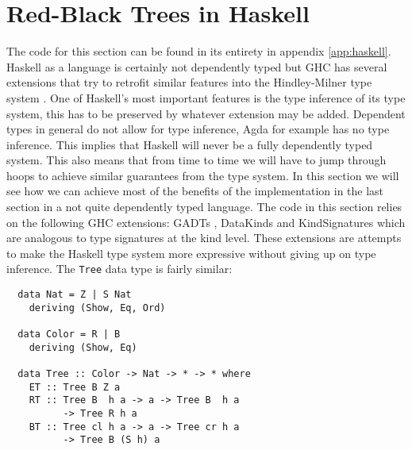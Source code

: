 \documentclass[journal, retainorgcmds]{IEEEtran}
\newcommand{\ihask}[1]{\texttt{#1}}
\begin{document}
\section{Red-Black Trees in Haskell}

The code for this section can be found in its entirety in appendix
\ref{app:haskell}.
Haskell as a language is certainly not dependently typed but GHC \cite{ghc} has
several extensions that try to retrofit similar features into the
Hindley-Milner type system \cite{hindley}.
One of Haskell's most important features is the type inference of its type
system, this has to be preserved by whatever extension may be added.
Dependent types in general do not allow for type inference, Agda for example
has no type inference.
This implies that Haskell will never be a fully dependently typed system.
This also means that from time to time we will have to jump through hoops to
achieve similar guarantees from the type system.
In this section we will see how we can achieve most of the benefits of the
implementation in the last section in a not quite dependently typed language.
The code in this section relies on the following GHC extensions: GADTs
\cite{gadts}, DataKinds \cite{datakinds} and KindSignatures which are analogous
to type signatures at the kind level.
These extensions are attempts to make the Haskell type system more expressive
without giving up on type inference.
The \ihask{Tree} data type is fairly similar:

\begin{verbatim}
  data Nat = Z | S Nat
    deriving (Show, Eq, Ord)

  data Color = R | B
    deriving (Show, Eq)

  data Tree :: Color -> Nat -> * -> * where
    ET :: Tree B Z a
    RT :: Tree B  h a -> a -> Tree B  h a
          -> Tree R h a
    BT :: Tree cl h a -> a -> Tree cr h a
          -> Tree B (S h) a
\end{verbatim}
\end{document}

